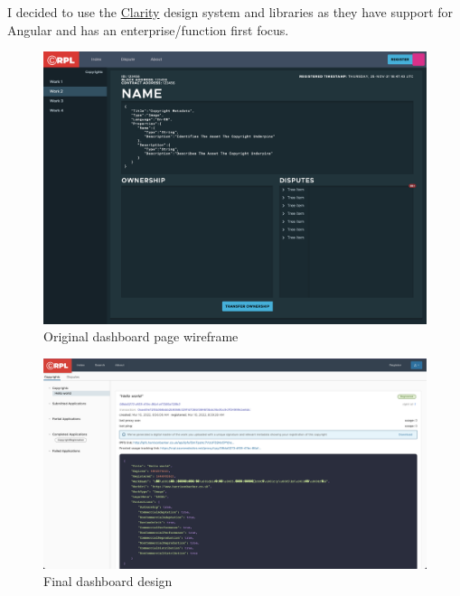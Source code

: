 \documentclass[12pt]{article}
\begin{document}
I decided to use the \href{https://clarity.design/}{Clarity} design system and libraries as they have support for Angular and has an enterprise/function first focus.

\begin{figure}[H]
\caption{Original dashboard page wireframe}
\centering
\includegraphics[width=\textwidth,height=0.5\textheight,keepaspectratio]{images/wireframe/Dashboard}
\end{figure}

\begin{figure}[H]
\caption{Final dashboard design}
\centering
\includegraphics[width=\textwidth,height=0.5\textheight,keepaspectratio]{images/wireframe/dashboard-real}
\end{figure}
\end{document}
